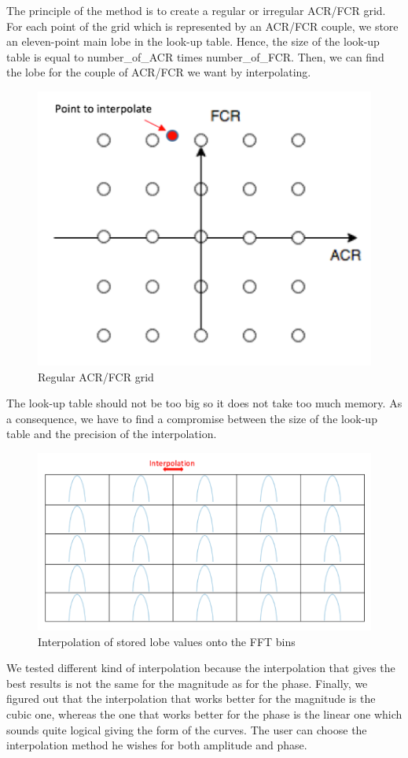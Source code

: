 \documentclass[]{article}
\begin{document}
The principle of the method is to create a regular or irregular ACR/FCR grid. For each point of the grid which is represented by an ACR/FCR couple, we store an eleven-point main lobe in the look-up table. Hence, the size of the look-up table is equal to number\_of\_ACR times number\_of\_FCR. Then, we can find the lobe for the couple of ACR/FCR we want by interpolating.
\begin{figure}[H]
	\centering
	\includegraphics[scale=0.6]{grid.png}
	\caption{ Regular ACR/FCR grid}
\end{figure}

The look-up table should not be too big so it does not take too much memory. As a consequence, we have to find a compromise between the size of the look-up table and the precision of the interpolation.

\begin{figure}[H]
	\centering
	\includegraphics[scale=0.8]{LUT.png}
	\caption{ Interpolation of stored lobe values onto the FFT bins}
\end{figure}
\newpage
We tested different kind of interpolation because the interpolation that gives the best results is not the same for the magnitude as for the phase. Finally, we figured out that the interpolation that works better for the magnitude is the cubic one, whereas the one that works better for the phase is the linear one which sounds quite logical giving the form of the curves. The user can choose the interpolation method he wishes for both amplitude and phase.
\end{document}
